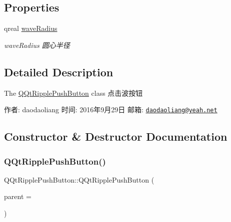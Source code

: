 \subsection*{Properties}
\begin{DoxyCompactItemize}
\item 
\mbox{\label{class_q_qt_ripple_push_button_abce7723d0877a018914d0be47f51a03c}} 
qreal \mbox{\hyperlink{class_q_qt_ripple_push_button_abce7723d0877a018914d0be47f51a03c}{wave\+Radius}}
\begin{DoxyCompactList}\small\item\em wave\+Radius 圆心半径 \end{DoxyCompactList}\end{DoxyCompactItemize}


\subsection{Detailed Description}
The \mbox{\hyperlink{class_q_qt_ripple_push_button}{Q\+Qt\+Ripple\+Push\+Button}} class 点击波按钮 

作者\+: daodaoliang 时间\+: 2016年9月29日 邮箱\+: \href{mailto:daodaoliang@yeah.net}{\tt daodaoliang@yeah.\+net} 

\subsection{Constructor \& Destructor Documentation}
\mbox{\label{class_q_qt_ripple_push_button_a972f5549b932b06df601f157bbd73baa}} 
\subsubsection{\texorpdfstring{Q\+Qt\+Ripple\+Push\+Button()}{QQtRipplePushButton()}}
{\footnotesize\ttfamily Q\+Qt\+Ripple\+Push\+Button\+::\+Q\+Qt\+Ripple\+Push\+Button (\begin{DoxyParamCaption}\item[{Q\+Widget $\ast$}]{parent = {} }\end{DoxyParamCaption})\hspace{0.3cm}{\ttfamily [explicit]}}



